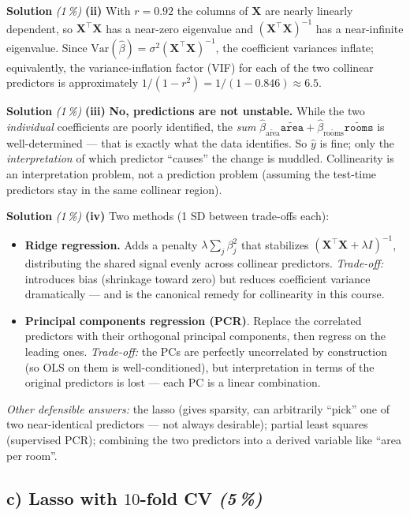 \documentclass[11pt,a4paper]{article}
\newcommand{\subpoints}[1]{\textit{(#1\,\%)}}
\newcommand{\sol}{\noindent\textbf{Solution}}
\begin{document}
\medskip
\sol{} \subpoints{1} \textbf{(ii)} With $r = 0.92$ the columns of $\mathbf X$ are nearly linearly
dependent, so $\mathbf X^\top \mathbf X$ has a near-zero eigenvalue and $(\mathbf X^\top \mathbf X)^{-1}$
has a near-infinite eigenvalue. Since $\mathrm{Var}(\hat\beta) = \sigma^2 (\mathbf X^\top \mathbf X)^{-1}$,
the coefficient variances inflate; equivalently, the variance-inflation factor (VIF) for each of
the two collinear predictors is approximately $1/(1-r^2) = 1/(1-0.846) \approx 6.5$.

\medskip
\sol{} \subpoints{1} \textbf{(iii)} \textbf{No, predictions are not unstable.} While the two
\emph{individual} coefficients are poorly identified, the \emph{sum}
$\hat\beta_{\widetilde{\text{area}}}\widetilde{\texttt{area}} + \hat\beta_{\widetilde{\text{rooms}}}\widetilde{\texttt{rooms}}$
is well-determined --- that is exactly what the data identifies. So $\hat y$ is fine; only the
\emph{interpretation} of which predictor ``causes'' the change is muddled. Collinearity is an
interpretation problem, not a prediction problem (assuming the test-time predictors stay in the
same collinear region).

\medskip
\sol{} \subpoints{1} \textbf{(iv)} Two methods (1 SD between trade-offs each):
\begin{itemize}
  \item \textbf{Ridge regression.} Adds a penalty $\lambda\sum_j\beta_j^2$ that stabilizes
        $(\mathbf X^\top \mathbf X + \lambda I)^{-1}$, distributing the shared signal evenly
        across collinear predictors. \emph{Trade-off:} introduces bias (shrinkage toward zero)
        but reduces coefficient variance dramatically --- and is the canonical remedy for
        collinearity in this course.
  \item \textbf{Principal components regression (PCR)}. Replace the correlated predictors with
        their orthogonal principal components, then regress on the leading ones. \emph{Trade-off:}
        the PCs are perfectly uncorrelated by construction (so OLS on them is well-conditioned),
        but interpretation in terms of the original predictors is lost --- each PC is a linear
        combination.
\end{itemize}
\emph{Other defensible answers:} the lasso (gives sparsity, can arbitrarily ``pick'' one of two
near-identical predictors --- not always desirable); partial least squares (supervised PCR);
combining the two predictors into a derived variable like ``area per room''.

\subsection*{c) Lasso with $10$-fold CV \subpoints{5}}
\end{document}

